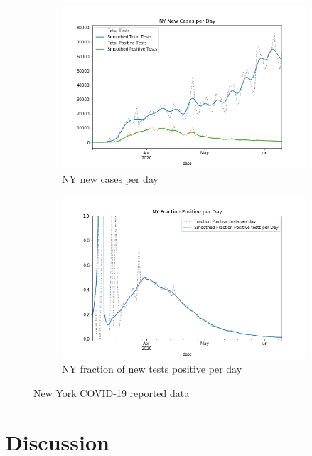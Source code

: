 \documentclass[11pt]{amsart}
\begin{document}
\begin{figure}
\centering
\begin{subfigure}{.5\textwidth}
  \centering
  \includegraphics[width=.9\linewidth]{../methods/figs/NY_casecount.png}
  \caption{NY new cases per day}
  \label{fig:ny-covid-test}
\end{subfigure}%
\begin{subfigure}{.5\textwidth}
  \centering
  \includegraphics[width=.9\linewidth]{../methods/figs/NY_fracpos.png}
  \caption{NY fraction of new tests positive per day}
  \label{fig:ny-covid-frac}
\end{subfigure}
\caption{New York COVID-19 reported data}
\label{fig:ny-covid}
\end{figure}



\section{Discussion}
\label{section:discussion}
\end{document}
